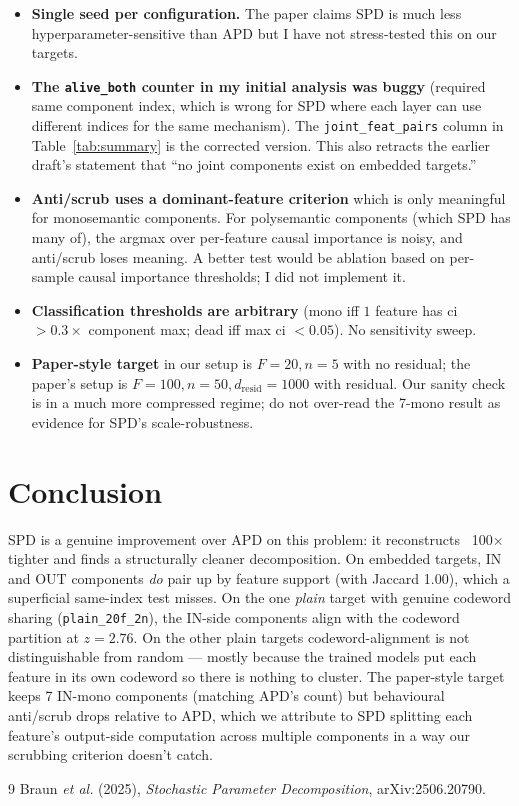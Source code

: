 \documentclass[11pt]{article}
\begin{document}
\begin{itemize}
\item \textbf{Single seed per configuration.} The paper claims SPD is
  much less hyperparameter-sensitive than APD but I have not
  stress-tested this on our targets.
\item \textbf{The \texttt{alive\_both} counter in my initial analysis
  was buggy} (required same component index, which is wrong for SPD
  where each layer can use different indices for the same mechanism).
  The \texttt{joint\_feat\_pairs} column in Table~\ref{tab:summary} is
  the corrected version. This also retracts the earlier draft's
  statement that ``no joint components exist on embedded targets.''
\item \textbf{Anti/scrub uses a dominant-feature criterion} which is
  only meaningful for monosemantic components. For polysemantic
  components (which SPD has many of), the argmax over per-feature
  causal importance is noisy, and anti/scrub loses meaning. A better
  test would be ablation based on per-sample causal importance
  thresholds; I did not implement it.
\item \textbf{Classification thresholds are arbitrary} (mono iff $1$
  feature has ci $> 0.3 \times$ component max; dead iff max ci $< 0.05$).
  No sensitivity sweep.
\item \textbf{Paper-style target} in our setup is $F = 20, n = 5$ with
  no residual; the paper's setup is $F = 100, n = 50, d_\mathrm{resid}
  = 1000$ with residual. Our sanity check is in a much more compressed
  regime; do not over-read the 7-mono result as evidence for SPD's
  scale-robustness.
\end{itemize}

\section{Conclusion}

SPD is a genuine improvement over APD on this problem: it reconstructs
~100× tighter and finds a structurally cleaner decomposition. On
embedded targets, IN and OUT components \emph{do} pair up by feature
support (with Jaccard 1.00), which a superficial same-index test
misses. On the one \emph{plain} target with genuine codeword sharing
(\texttt{plain\_20f\_2n}), the IN-side components align with the
codeword partition at $z = 2.76$. On the other plain targets
codeword-alignment is not distinguishable from random — mostly because
the trained models put each feature in its own codeword so there is
nothing to cluster. The paper-style target keeps 7 IN-mono components
(matching APD's count) but behavioural anti/scrub drops relative to
APD, which we attribute to SPD splitting each feature's output-side
computation across multiple components in a way our scrubbing
criterion doesn't catch.

\begin{thebibliography}{9}
 Braun \textit{et al.} (2025), \emph{Stochastic
Parameter Decomposition}, arXiv:2506.20790.
\end{thebibliography}
\end{document}
